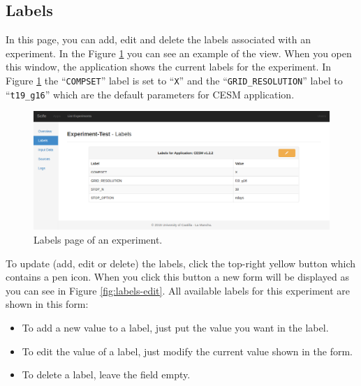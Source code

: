 \documentclass[11pt]{article}
\begin{document}
\subsection{Labels}\label{sec:labels}
In this page, you can add, edit and delete the labels associated with an experiment. In the Figure \ref{fig:labels} you can see an example of the view. When you open this window, the application shows the current labels for the experiment. In Figure \ref{fig:labels} the ``\texttt{COMPSET}'' label is set to ``\texttt{X}'' and the ``\texttt{GRID\_RESOLUTION}'' label to ``\texttt{t19\_g16}'' which are the default parameters for CESM application.
\begin{figure}[htp]
	\centering
	\includegraphics[width=\linewidth]{img/labels}
	\caption{Labels page of an experiment.}
	\label{fig:labels}
\end{figure}

To update (add, edit or delete) the labels, click the top-right yellow button which contains a pen icon. When you click this button a new form will be displayed as you can see in Figure \ref{fig:labels-edit}. All available labels for this experiment are shown in this form:
\begin{itemize}
	\item To add a new value to a label, just put the value you want in the label.
	\item To edit the value of a label, just modify the current value shown in the form.
	\item To delete a label, leave the field empty.
\end{itemize}
\end{document}
